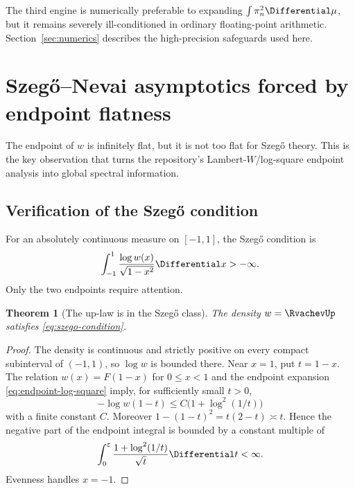 \documentclass[11pt,oneside]{article}
\newtheorem{theorem}{Theorem}[section]
\theoremstyle{definition}
\theoremstyle{remark}
\numberwithin{equation}{section}
\begin{document}
The third engine is numerically preferable to expanding
$\int\pi_n^2\Differential\mu$, but it remains severely ill-conditioned in ordinary
floating-point arithmetic.  Section~\ref{sec:numerics} describes the
high-precision safeguards used here.

\section{Szeg\H{o}--Nevai asymptotics forced by endpoint flatness}
\label{sec:szego-nevai}

The endpoint of $w$ is infinitely flat, but it is not too flat for Szeg\H{o}
theory.  This is the key observation that turns the repository's
Lambert-$W$/log-square endpoint analysis into global spectral information.

\subsection{Verification of the Szeg\H{o} condition}
For an absolutely continuous measure on $[-1,1]$, the Szeg\H{o} condition is
\begin{equation}
 \int_{-1}^{1}\frac{\log w(x)}{\sqrt{1-x^2}}\Differential x>-\infty.
 \label{eq:szego-condition}
\end{equation}
Only the two endpoints require attention.

\begin{theorem}[The up-law is in the Szeg\H{o} class]
\label{thm:up-szego}
The density $w=\RvachevUp$ satisfies \cref{eq:szego-condition}.
\end{theorem}

\begin{proof}
The density is continuous and strictly positive on every compact subinterval
of $(-1,1)$, so $\log w$ is bounded there.  Near $x=1$, put $t=1-x$.
The relation $w(x)=F(1-x)$ for $0\le x<1$ and the endpoint expansion
\cref{eq:endpoint-log-square} imply, for sufficiently small $t>0$,
\begin{equation}
 -\log w(1-t)\le C\bigl(1+\log^2(1/t)\bigr)
 \label{eq:endpoint-majorant}
\end{equation}
with a finite constant $C$.  Moreover
$1-(1-t)^2=t(2-t)\asymp t$.  Hence the negative part of the endpoint
integral is bounded by a constant multiple of
\begin{equation}
 \int_0^\varepsilon
   \frac{1+\log^2(1/t)}{\sqrt t}\Differential t<\infty.
 \label{eq:szego-endpoint-integral}
\end{equation}
Evenness handles $x=-1$.
\end{proof}
\end{document}
